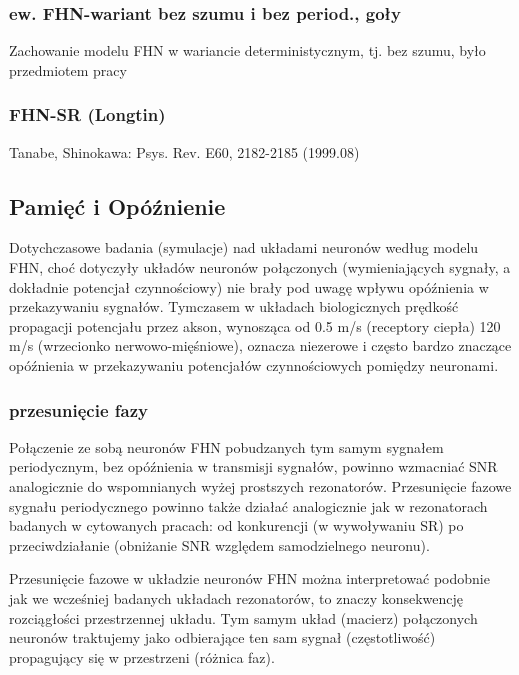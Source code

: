 \documentclass[12pt]{article}
\begin{document}
  \subsubsection{ew. FHN-wariant bez szumu i bez period., goły}

  Zachowanie modelu FHN w wariancie deterministycznym, tj. bez szumu, było przedmiotem pracy \cite{alexander}

  \subsubsection{FHN-SR (Longtin)}


  Tanabe, Shinokawa: Psys. Rev. E60, 2182-2185 (1999.08)
  
  \subsection{Pamięć i Opóźnienie}
  
  Dotychczasowe badania (symulacje) nad układami neuronów według modelu FHN, choć dotyczyły układów neuronów połączonych (wymieniających sygnały, a dokładnie potencjał czynnościowy) nie brały pod uwagę wpływu opóźnienia w przekazywaniu sygnałów. Tymczasem w układach biologicznych prędkość propagacji potencjału przez akson, wynosząca od 0.5 m/s (receptory ciepła) 120 m/s (wrzecionko nerwowo-mięśniowe), oznacza niezerowe i często bardzo znaczące opóźnienia w przekazywaniu potencjałów czynnościowych pomiędzy neuronami.

  \subsubsection{przesunięcie fazy}

  Połączenie ze sobą neuronów FHN pobudzanych tym samym sygnałem periodycznym, bez opóźnienia w transmisji sygnałów, powinno wzmacniać SNR analogicznie do wspomnianych wyżej prostszych rezonatorów. Przesunięcie fazowe sygnału periodycznego powinno także działać analogicznie jak w rezonatorach badanych w cytowanych pracach: od konkurencji (w wywoływaniu SR) po przeciwdziałanie (obniżanie SNR względem samodzielnego neuronu). \cite{ijmpb_14_8}

  Przesunięcie fazowe w układzie neuronów FHN można interpretować podobnie jak we wcześniej badanych układach rezonatorów, to znaczy konsekwencję rozciągłości przestrzennej układu. Tym samym układ (macierz) połączonych neuronów traktujemy jako odbierające ten sam sygnał (częstotliwość) propagujący się w przestrzeni (różnica faz).
\end{document}
